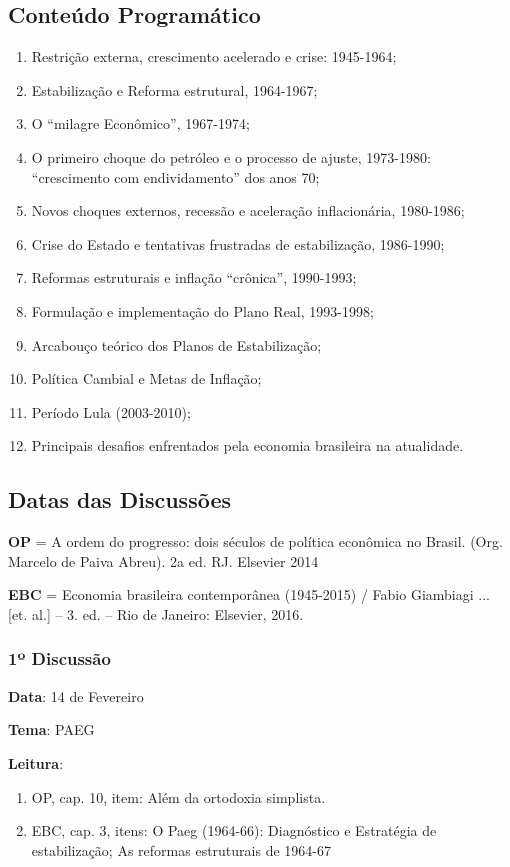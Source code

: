 \documentclass[a4paper,12pt]{article}[abntex2]
\begin{document}
\subsection*{\textbf{Conteúdo Programático}}

\begin{enumerate}
    \item Restrição externa, crescimento acelerado e crise: 1945-1964;
    \item Estabilização e Reforma estrutural, 1964-1967;
    \item O “milagre Econômico”, 1967-1974;
    \item O primeiro choque do petróleo e o processo de ajuste, 1973-1980: “crescimento com endividamento” dos anos 70;
    \item Novos choques externos, recessão e aceleração inflacionária, 1980-1986;
    \item Crise do Estado e tentativas frustradas de estabilização, 1986-1990;
    \item Reformas estruturais e inflação “crônica”, 1990-1993;
    \item Formulação e implementação do Plano Real, 1993-1998;
    \item Arcabouço teórico dos Planos de Estabilização;
    \item Política Cambial e Metas de Inflação;
    \item Período Lula (2003-2010);
    \item Principais desafios enfrentados pela economia brasileira na atualidade.
\end{enumerate}

\subsection*{\textbf{Datas das Discussões}}
\textbf{OP} = A ordem do progresso: dois séculos de política econômica no Brasil. (Org. Marcelo de Paiva Abreu). 2a ed. RJ. Elsevier 2014

\textbf{EBC} = Economia brasileira contemporânea (1945-2015) / Fabio Giambiagi ... [et. al.] – 3. ed. – Rio de Janeiro: Elsevier, 2016.

\subsubsection*{\textbf{1º Discussão}}
\textbf{Data}: 14 de Fevereiro

\textbf{Tema}: PAEG

\textbf{Leitura}:\begin{enumerate}
    \item OP, cap. 10, item: Além da ortodoxia simplista. 
    \item EBC, cap. 3, itens: O Paeg (1964-66): Diagnóstico e Estratégia de estabilização; As reformas estruturais de 1964-67
\end{enumerate}
\end{document}
